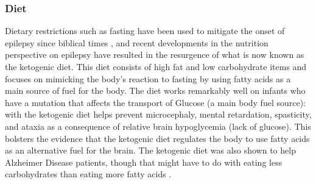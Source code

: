 \subsubsection{Diet}
Dietary restrictions such as fasting have been used to mitigate the onset of epilepsy since biblical times \cite{bailey2005use}, and recent developments in the nutrition perspective on epilepsy have resulted in the resurgence of what is now known as the ketogenic diet. This diet consists of high fat and low carbohydrate items and focuses on mimicking the body's reaction to fasting by using fatty acids as a main source of fuel for the body. The diet works remarkably well on infants who have a mutation that affects the transport of Glucose (a main body fuel source): with the ketogenic diet helps prevent microcephaly, mental retardation, spasticity, and ataxia as a consequence of relative brain hypoglycemia (lack of glucose). This bolsters the evidence that the ketogenic diet regulates the body to use fatty acids as an alternative fuel for the brain. The ketogenic diet was also shown to help Alzheimer Disease patients, though that might have to do with eating less carbohydrates than eating more fatty acids \cite{baranano2008ketogenic}.

